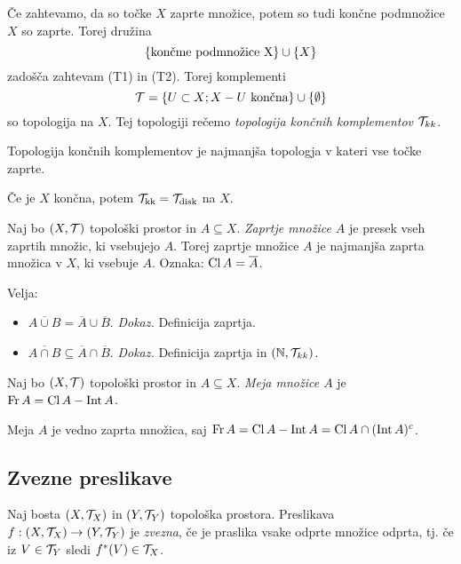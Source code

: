 \begin{primer}
    Če zahtevamo, da so točke $X$ zaprte množice, potem so tudi končne podmnožice $X$ so zaprte. Torej družina
    $$\left\{\text{končme podmnožice X}\right\} \cup \left\{X\right\}$$
    zadošča zahtevam (T1) in (T2). Torej komplementi
    $$\mathcal{T} = \left\{U \subset X; X - U \text{ končna}\right\} \cup \left\{\emptyset\right\}$$
    so topologija na $X$. Tej topologiji rečemo \emph{topologija končnih komplementov $\mathcal{T}_{kk}$}.

    Topologija končnih komplementov je najmanjša topologja v kateri vse točke zaprte. 
    
    Če je $X$ končna, potem $\mathcal{T}_{\text{kk}}=\mathcal{T}_{\text{disk}}$ na $X$.
\end{primer}

\begin{definicija}
    Naj bo $(X, \mathcal{T})$ topološki prostor in $A \subseteq X$. \emph{Zaprtje množice $A$} je presek vseh zaprtih množic, ki vsebujejo $A$. Torej zaprtje množice $A$ je najmanjša zaprta množica v $X$, ki vsebuje $A$. Oznaka: $\operatorname{Cl} A = \overline{A}$.
\end{definicija}

\begin{primer}
    Velja:
    \begin{itemize}
        \item $\overline{A \cup B} = \overline{A} \cup \overline{B}$. \emph{Dokaz.} Definicija zaprtja.
        \item $\overline{A \cap B} \subseteq \overline{A} \cap \overline{B}$. \emph{Dokaz.} Definicija zaprtja in $(\mathbb{N}, \mathcal{T}_{kk})$.
    \end{itemize}
\end{primer}

\begin{definicija}
    Naj bo $(X, \mathcal{T})$ topološki prostor in $A \subseteq X$. \emph{Meja množice $A$} je $\operatorname{Fr} A = \operatorname{Cl} A - \operatorname{Int} A$.
\end{definicija}

\begin{opomba}
    Meja $A$ je vedno zaprta množica, saj $\operatorname{Fr} A = \operatorname{Cl} A - \operatorname{Int} A = \operatorname{Cl} A \cap (\operatorname{Int} A)^c$.
\end{opomba}

\subsection{Zvezne preslikave}
\begin{definicija}    
    Naj bosta $(X, \mathcal{T}_X)$ in $(Y, \mathcal{T}_Y)$ topološka prostora. Preslikava $f: (X, \mathcal{T}_X) \to (Y, \mathcal{T}_Y)$ je \emph{zvezna}, če je praslika vsake odprte množice odprta, tj. če iz $V \in \mathcal{T}_Y$ sledi $f^{*}(V) \in \mathcal{T}_X$.
\end{definicija}

